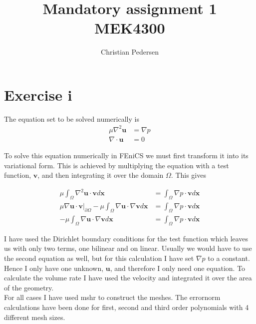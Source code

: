 \documentclass[11pt]{report}
\begin{document}
\title{Mandatory assignment 1 \\ MEK4300}
\author{Christian Pedersen}

\maketitle

\chapter*{Exercise i}
The equation set to be solved numerically is \begin{equation} \begin{split} \mu \nabla ^2\mathbf{u} &= \nabla p \\ \nabla \cdot \mathbf{u} &= 0 \end{split} \end{equation}

To solve this equation numerically in FEniCS we must first transform it into its variational form. This is achieved by multiplying the equation with a test function, $\mathbf{v}$, and then integrating it over the domain $\Omega$. This gives

\begin{equation}
\begin{split}
\mu \int _\Omega \nabla ^2 \mathbf{u} \cdot \mathbf{v} d\mathbf{x} & = \int _\Omega \nabla p \cdot \mathbf{v} d\mathbf{x} \\
\mu \nabla \mathbf{u}\cdot \mathbf{v} \Big |_{\partial \Omega} - \mu \int _\Omega \nabla \mathbf{u}\cdot \nabla \mathbf{v} d\mathbf{x} &= \int _\Omega \nabla p\cdot \mathbf{v}d\mathbf{x} \\
-\mu \int _\Omega \nabla \mathbf{u}\cdot \nabla \mathbf{v} d\mathbf{x} &= \int _\Omega \nabla p\cdot\mathbf{v}d\mathbf{x}
\end{split}
\end{equation}

I have used the Dirichlet boundary conditions for the test function which leaves us with only two terms, one bilinear and on linear. Usually we would have to use the second equation as well, but for this calculation I have set $\nabla p$ to a constant. Hence I only have one unknown, $\mathbf{u}$, and therefore I only need one equation. To calculate the volume rate I have used the velocity and integrated it over the area of the geometry.\\

For all cases I have used mshr to construct the meshes. The errornorm calculations have been done for first, second and third order polynomials with 4 different mesh sizes. \\
\end{document}
